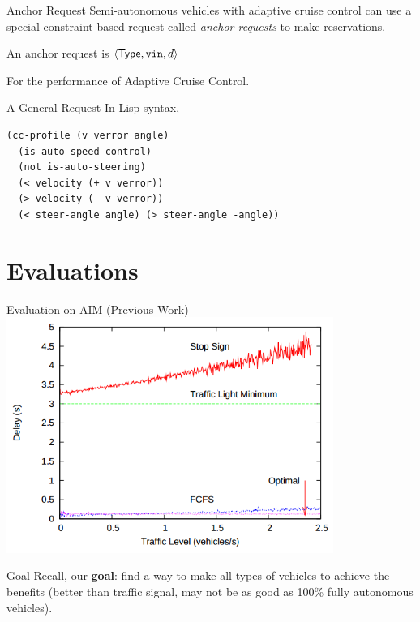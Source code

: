 \documentclass{beamer}
\newcommand{\goal}{find a way to make all types of vehicles to
achieve the benefits (better than traffic signal, may not be as good
as 100\% fully autonomous vehicles)}
\begin{document}
\begin{frame}{Anchor Request}
Semi-autonomous vehicles with adaptive cruise control can use a special
constraint-based request called \emph{anchor requests} to make
reservations.\pause

\hfill

An anchor request is $\langle {\sf Type}, \texttt{vin},
d \rangle$

For the performance of Adaptive Cruise Control.
\end{frame}

\begin{frame}[fragile]{A General Request}
In Lisp syntax,

\begin{small}
\begin{verbatim}
(cc-profile (v verror angle)
  (is-auto-speed-control)
  (not is-auto-steering)
  (< velocity (+ v verror))
  (> velocity (- v verror))
  (< steer-angle angle) (> steer-angle -angle))
\end{verbatim}
\end{small}
\end{frame}

\section{Evaluations}

\begin{frame}{Evaluation on AIM (Previous Work)}
\includegraphics[width=0.8\textwidth]{old_result.png}

\cite{bib:Dresner08Multiagent}
\end{frame}

\begin{frame}{Goal}
Recall, our \textbf{goal}: \pause \goal.
\end{frame}
\end{document}
